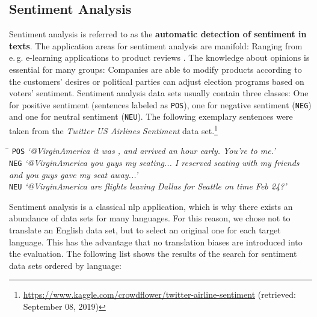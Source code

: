 \subsection{Sentiment Analysis}
\label{sec:sentiment_analysis}

 Sentiment analysis is referred to as the \textbf{automatic detection of sentiment in texts}. The application areas for sentiment analysis are manifold: Ranging from e.\,g. e-learning applications \citep{Ortigosa.2014,Koehler.2015} to product reviews \citep{Fang.2015}. The knowledge about opinions is essential for many groups: Companies are able to modify products according to the customers' desires or political parties can adjust election programs based on voters' sentiment. Sentiment analysis data sets usually contain three classes: One for positive sentiment (sentences labeled as \texttt{POS}), one for negative sentiment (\texttt{NEG}) and one for neutral sentiment (\texttt{NEU}). The following exemplary sentences were taken from the \textit{Twitter US Airlines Sentiment} data set.\footnote{\url{https://www.kaggle.com/crowdflower/twitter-airline-sentiment} (retrieved: September 08, 2019)}

\vspace*{-3mm}
\begin{tabbing}
	\hspace*{1cm}\=\hspace*{1cm}\=\kill
	\texttt{POS} \> \textit{`@VirginAmerica it was , and arrived an hour early. You're  to me.'} \\[1mm]
	\texttt{NEG} \> \textit{`@VirginAmerica you guys  my seating... I reserved seating with my friends} \\ \>\> \textit{and you guys gave my seat away...'} \\[1mm]
	\texttt{NEU} \> \textit{`@VirginAmerica are flights leaving Dallas for Seattle on time Feb 24?'}
\end{tabbing}
\vspace*{-3mm}

 Sentiment analysis is a classical \gls{nlp} application, which is why there exists an abundance of data sets for many languages. For this reason, we chose not to translate an English data set, but to select an original one for each target language. This has the advantage that no translation biases are introduced into the evaluation. The following list shows the results of the search for sentiment data sets ordered by language:

